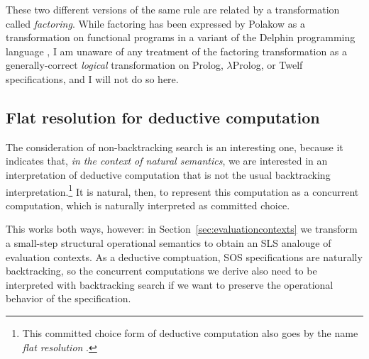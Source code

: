 These two different versions of the same rule are related by a
transformation called {\it factoring}. While factoring has been
expressed by Polakow as a transformation on functional programs in a
variant of the Delphin programming language
\cite{poswolsky03factoring}, I am unaware of any treatment of the
factoring transformation as a generally-correct {\it logical}
transformation on Prolog, $\lambda$Prolog, or Twelf specifications,
and I will not do so here.

\subsection{Flat resolution for deductive computation}

The consideration of non-backtracking search is an interesting one,
because it indicates that, {\it in the context of natural semantics},
we are interested in an interpretation of deductive computation that is
not the usual backtracking interpretation.\footnote{This committed
  choice form of deductive computation also goes by the name {\it flat
    resolution} \cite{aitkaci99warrens}.} It is natural, then, to
represent this computation as a concurrent computation, which is
naturally interpreted as committed choice. 

This works both ways, however: in Section~\ref{sec:evaluationcontexts}
we transform a small-step structural operational semantics to obtain
an SLS analouge of evaluation contexts. As a deductive comptuation,
SOS specifications are naturally backtracking, so the concurrent
computations we derive also need to be interpreted with backtracking
search if we want to preserve the operational behavior of the
specification.

